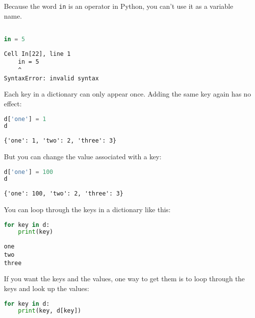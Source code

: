 Because the word \passthrough{\lstinline!in!} is an operator in Python,
you can't use it as a variable name.

\begin{lstlisting}[language=Python,style=source]
%%expect SyntaxError

in = 5
\end{lstlisting}

\begin{lstlisting}[style=output]
  Cell In[22], line 1
    in = 5
    ^
SyntaxError: invalid syntax
\end{lstlisting}

Each key in a dictionary can only appear once. Adding the same key again
has no effect:

\begin{lstlisting}[language=Python,style=source]
d['one'] = 1
d
\end{lstlisting}

\begin{lstlisting}[style=output]
{'one': 1, 'two': 2, 'three': 3}
\end{lstlisting}

\pagebreak

But you can change the value associated with a key:

\begin{lstlisting}[language=Python,style=source]
d['one'] = 100
d
\end{lstlisting}

\begin{lstlisting}[style=output]
{'one': 100, 'two': 2, 'three': 3}
\end{lstlisting}

You can loop through the keys in a dictionary like this:

\begin{lstlisting}[language=Python,style=source]
for key in d:
    print(key)
\end{lstlisting}

\begin{lstlisting}[style=output]
one
two
three
\end{lstlisting}

If you want the keys and the values, one way to get them is to loop
through the keys and look up the values:

\begin{lstlisting}[language=Python,style=source]
for key in d:
    print(key, d[key])
\end{lstlisting}

